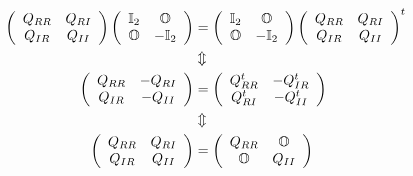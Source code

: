\documentclass[aps,preprint]{revtex4}%
\begin{document}
\begin{align}
\left(
\begin{array}
[c]{cc}%
Q_{RR} & Q_{RI}\\
Q_{IR} & Q_{II}%
\end{array}
\right)  \left(
\begin{array}
[c]{cc}%
\mathbb{I}_{2} & \mathbb{O}\\
\mathbb{O} & -\mathbb{I}_{2}%
\end{array}
\right)   &  =\left(
\begin{array}
[c]{cc}%
\mathbb{I}_{2} & \mathbb{O}\\
\mathbb{O} & -\mathbb{I}_{2}%
\end{array}
\right)  \left(
\begin{array}
[c]{cc}%
Q_{RR} & Q_{RI}\\
Q_{IR} & Q_{II}%
\end{array}
\right)  ^{t}\\
&  \Updownarrow\\
\left(
\begin{array}
[c]{cc}%
Q_{RR} & -Q_{RI}\\
Q_{IR} & -Q_{II}%
\end{array}
\right)   &  =\left(
\begin{array}
[c]{cc}%
Q_{RR}^{t} & -Q_{IR}^{t}\\
Q_{RI}^{t} & -Q_{II}^{t}%
\end{array}
\right) \\
&  \Updownarrow\\
\left(
\begin{array}
[c]{cc}%
Q_{RR} & Q_{RI}\\
Q_{IR} & Q_{II}%
\end{array}
\right)   &  =\left(
\begin{array}
[c]{cc}%
Q_{RR} & \mathbb{O}\\
\mathbb{O} & Q_{II}%
\end{array}
\right)
\end{align}%
\end{document}
